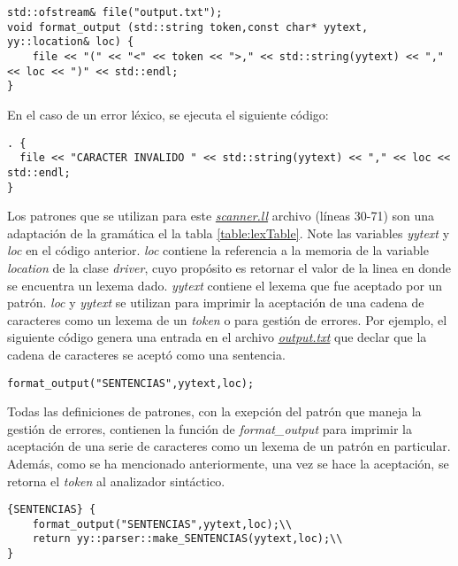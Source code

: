 \begin{lstlisting}
std::ofstream& file("output.txt");
void format_output (std::string token,const char* yytext, yy::location& loc) {
    file << "(" << "<" << token << ">," << std::string(yytext) << "," << loc << ")" << std::endl;
}
\end{lstlisting}
En el caso de un error léxico, se ejecuta el siguiente código:
\begin{lstlisting}
. {
  file << "CARACTER INVALIDO " << std::string(yytext) << "," << loc << std::endl;
}
\end{lstlisting}
Los patrones que se utilizan para este \href{https://github.com/aramis-matos/comp4999_compilers_project/blob/master/code/scanner.ll}{\textit{scanner.ll}} archivo (líneas 30-71) son una adaptación de la gramática el la tabla \ref{table:lexTable}. Note las variables \textit{yytext} y \textit{loc} en el código anterior. 
\textit{loc} contiene la referencia a la memoria de la variable \textit{location} de la clase \textit{driver}, cuyo propósito es retornar el valor de la linea en donde se encuentra un lexema dado.
\textit{yytext} contiene el lexema que fue aceptado por un patrón.
\textit{loc} y \textit{yytext} se utilizan para imprimir la aceptación de una cadena de caracteres como un lexema de un \textit{token} o para gestión de errores. Por ejemplo, el siguiente código genera una entrada en el archivo \href{https://github.com/aramis-matos/comp4999_compilers_project/blob/master/code/output.txt}\textit{output.txt} que declar que la cadena de caracteres se aceptó como una sentencia.
\begin{lstlisting}
format_output("SENTENCIAS",yytext,loc);
\end{lstlisting}

Todas las definiciones de patrones, con la exepción del patrón que maneja la gestión de errores, contienen la función de \textit{format\_output} para imprimir la aceptación de una serie de caracteres como un lexema de un patrón en particular.
Además, como se ha mencionado anteriormente, una vez se hace la aceptación, se retorna el \textit{token} al analizador sintáctico.

\begin{lstlisting}
{SENTENCIAS} {
    format_output("SENTENCIAS",yytext,loc);\\
    return yy::parser::make_SENTENCIAS(yytext,loc);\\
}
\end{lstlisting}

